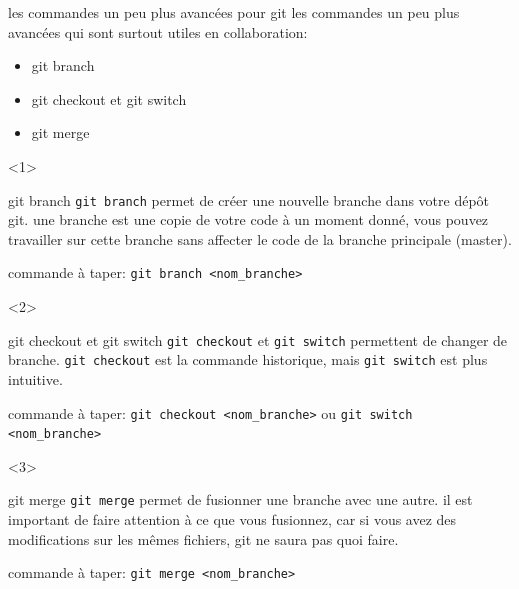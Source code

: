 \documentclass[usenames,dvipsnames]{beamer}
\begin{document}
\begin{frame}[fragile]{les commandes un peu plus avancées pour git}
	les commandes un peu plus avancées qui sont surtout utiles en collaboration: 
	\begin{itemize}
		\item<1-3> git branch
		\item <2-3> git checkout et git switch
		\item <3-3> git merge
	\end{itemize}

	\begin{onlyenv}
		\begin{block}{git branch}
			\texttt{git branch} permet de créer une nouvelle branche dans votre dépôt git. une branche est une copie de votre code à un moment donné, vous pouvez travailler sur cette branche sans affecter le code de la branche principale (master).
		\end{block}

		commande à taper: \lstinline|git branch <nom_branche>|
	\end{onlyenv}

	\begin{onlyenv}
		\begin{block}{git checkout et git switch}
			\texttt{git checkout} et \texttt{git switch} permettent de changer de branche. \texttt{git checkout} est la commande historique, mais \texttt{git switch} est plus intuitive.
		\end{block}

		commande à taper: \lstinline|git checkout <nom_branche>| ou \lstinline|git switch <nom_branche>|
	\end{onlyenv}

	\begin{onlyenv}
		\begin{block}{git merge}
			\texttt{git merge} permet de fusionner une branche avec une autre. il est important de faire attention à ce que vous fusionnez, car si vous avez des modifications sur les mêmes fichiers, git ne saura pas quoi faire.
		\end{block}

		commande à taper: \lstinline|git merge <nom_branche>|
	\end{onlyenv}
\end{frame}
\end{document}

